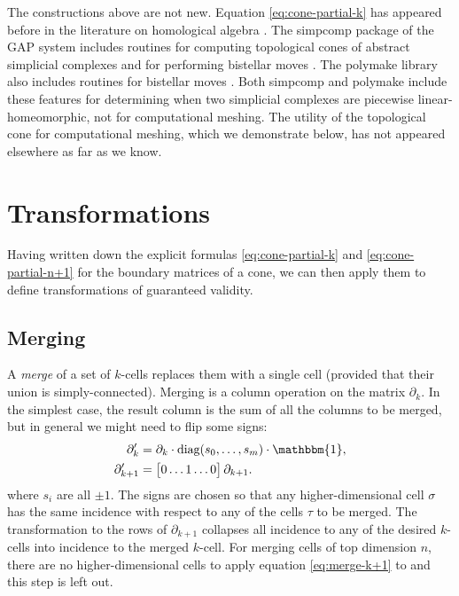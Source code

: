 \documentclass[twocolumn]{article}
\begin{document}
The constructions above are not new.
Equation \eqref{eq:cone-partial-k} has appeared before in the literature on homological algebra \cite{gelfand1994homological}.
The simpcomp package of the GAP system includes routines for computing topological cones of abstract simplicial complexes and for performing bistellar moves \cite{bjorner2000simplicial, effenberger2011simpcomp}.
The polymake library also includes routines for bistellar moves \cite{gawrilow2000polymake}.
Both simpcomp and polymake include these features for determining when two simplicial complexes are piecewise linear-homeomorphic, not for computational meshing.
The utility of the topological cone for computational meshing, which we demonstrate below, has not appeared elsewhere as far as we know.


\section{Transformations}

Having written down the explicit formulas \eqref{eq:cone-partial-k} and \eqref{eq:cone-partial-n+1} for the boundary matrices of a cone, we can then apply them to define transformations of guaranteed validity.

\subsection{Merging}

A \emph{merge} of a set of $k$-cells replaces them with a single cell (provided that their union is simply-connected).
Merging is a column operation on the matrix $\partial_k$.
In the simplest case, the result column is the sum of all the columns to be merged, but in general we might need to flip some signs:
\begin{align}
    \partial_k' & = \partial_k\cdot\text{diag}(s_0, \ldots, s_m)\cdot\mathbbm{1}, \\
    \partial_{k + 1}' & = \left[\begin{matrix} 0 \ldots 1 \ldots 0\end{matrix}\right]\partial_{k + 1}. \label{eq:merge-k+1}
\end{align}
where $s_i$ are all $\pm 1$.
The signs are chosen so that any higher-dimensional cell $\sigma$ has the same incidence with respect to any of the cells $\tau$ to be merged.
The transformation to the rows of $\partial_{k + 1}$ collapses all incidence to any of the desired $k$-cells into incidence to the merged $k$-cell.
For merging cells of top dimension $n$, there are no higher-dimensional cells to apply equation \eqref{eq:merge-k+1} to and this step is left out.
\end{document}
